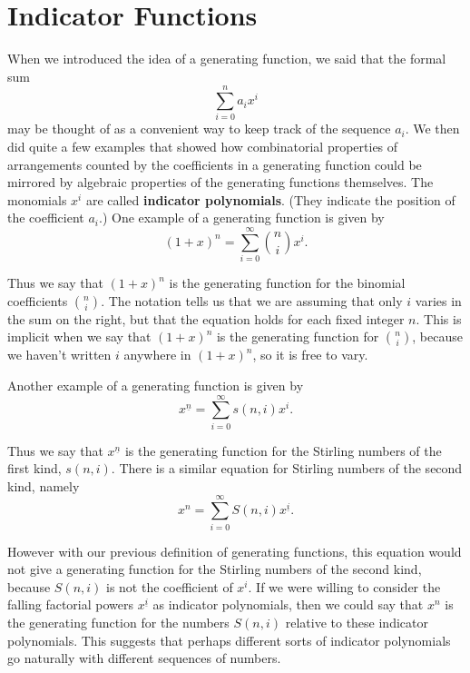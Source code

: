 \documentclass[10pt,]{book}
\newcommand{\terminology}[1]{\textbf{#1}}
\theoremstyle{plain}
\theoremstyle{definition}
\theoremstyle{definition}
\numberwithin{equation}{chapter}
\begin{document}
\section[{Indicator Functions}]{Indicator Functions}\label{section-22}
When we introduced the idea of a generating function, we said that the formal sum%
\begin{equation*}
\sum_{i=0}^n a_ix^i
\end{equation*}
may be thought of as a convenient way to keep track of the sequence \(a_i\). We then did quite a few examples that showed how combinatorial properties of arrangements counted by the coefficients in a generating function could be mirrored by algebraic properties of the generating functions themselves. The monomials \(x^i\) are called \terminology{indicator polynomials}. (They indicate the position of the coefficient \(a_i\).) One example of a generating function is given by%
\begin{equation*}
(1+x)^n = \sum_{i=0}^\infty \binom{n}{i}x^i.
\end{equation*}
%
\par
Thus we say that \((1+x)^n\) is the generating function for the binomial coefficients \(\binom{n}{i}\). The notation tells us that we are assuming that only \(i\) varies in the sum on the right, but that the equation holds for each fixed integer \(n\). This is implicit when we say that \((1+x)^n\) is the generating function for \(\binom{n}{i}\), because we haven't written \(i\) anywhere in \((1+x)^n\), so it is free to vary.%
\par
Another example of a generating function is given by%
\begin{equation*}
x^{\underline{n}} = \sum_{i=0}^\infty s(n,i)x^i.
\end{equation*}
%
\par
Thus we say that \(x^{\underline{n}}\) is the generating function for the Stirling numbers of the first kind, \(s(n,i)\). There is a similar equation for Stirling numbers of the second kind, namely%
\begin{equation*}
x^n = \sum_{i=0}^\infty S(n,i)x^{\underline{i}}.
\end{equation*}
%
\par
However with our previous definition of generating functions, this equation would not give a generating function for the Stirling numbers of the second kind, because \(S(n,i)\) is not the coefficient of \(x^i\). If we were willing to consider the falling factorial powers \(x^{\underline{i}}\) as indicator polynomials, then we could say that \(x^n\) is the generating function for the numbers \(S(n,i)\) relative to these indicator polynomials. This suggests that perhaps different sorts of indicator polynomials go naturally with different sequences of numbers.%
\end{document}
